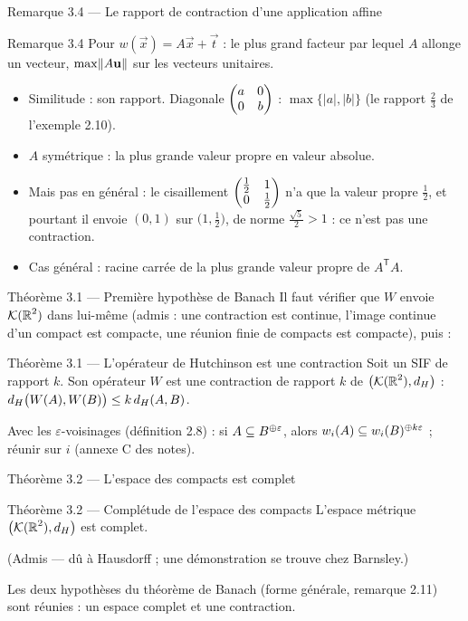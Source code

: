 \begin{frame}{Remarque 3.4 --- Le rapport de contraction d'une application affine}
  \begin{Rem}{Remarque 3.4}
    \small Pour $w(\vec x)=A\vec x+\vec t$ : le plus grand facteur par
    lequel $A$ allonge un vecteur, $\max\lVert A\mathbf{u} \rVert$ sur les vecteurs
    unitaires.
    \begin{itemize}
      \item Similitude : son rapport. Diagonale $\begin{pmatrix}a & 0\\ 0 & b\end{pmatrix}$ :
        $\max\{|a|,|b|\}$ (le rapport $\tfrac23$ de l'exemple 2.10).
      \item $A$ symétrique : la plus grande valeur propre en valeur absolue.
      \item Mais pas en général : le cisaillement
        $\begin{pmatrix}\tfrac12 & 1\\ 0 & \tfrac12\end{pmatrix}$ n'a que la valeur propre
        $\tfrac12$, et pourtant il envoie $(0,1)$ sur
        $\big(1,\tfrac12\big)$, de norme $\tfrac{\sqrt5}{2}>1$ : ce n'est
        pas une contraction.
      \item Cas général : racine carrée de la plus grande valeur propre
        de $A^{\mathsf T}A$.
    \end{itemize}
  \end{Rem}
\end{frame}

\begin{frame}{Théorème 3.1 --- Première hypothèse de Banach}
  \small Il faut vérifier que $W$ envoie $\mathcal{K}(\operatorname{\mathbb{R}}^2)$ dans lui-même
  (admis : une contraction est continue, l'image continue d'un compact
  est compacte, une réunion finie de compacts est compacte), puis :
  \begin{Enonce}{Théorème 3.1 --- L'opérateur de Hutchinson est une contraction}
    Soit un SIF de rapport $k$. Son opérateur $W$ est une contraction de
    rapport $k$ de $\big(\mathcal{K}(\operatorname{\mathbb{R}}^2),d_H\big)$ :
    $d_H\big(W(A),W(B)\big)\leq k\,d_H(A,B)$.
  \end{Enonce}
  \begin{AuTableau}
    \footnotesize Avec les $\varepsilon$-voisinages (définition 2.8) :
    si $A\subseteq B^{\oplus \varepsilon}$, alors
    $w_i(A)\subseteq w_i(B)^{\oplus k\varepsilon}$ ; réunir sur $i$
    (annexe C des notes).
  \end{AuTableau}
\end{frame}

\begin{frame}{Théorème 3.2 --- L'espace des compacts est complet}
  \begin{Enonce}{Théorème 3.2 --- Complétude de l'espace des compacts}
    L'espace métrique $\big(\mathcal{K}(\operatorname{\mathbb{R}}^2),d_H\big)$ est complet.
  \end{Enonce}
  \small (Admis --- dû à Hausdorff ; une démonstration se trouve chez
  Barnsley.)
  \vspace{6pt}

  Les deux hypothèses du théorème de Banach (forme générale,
  remarque 2.11) sont réunies : un espace complet et une contraction.
\end{frame}

